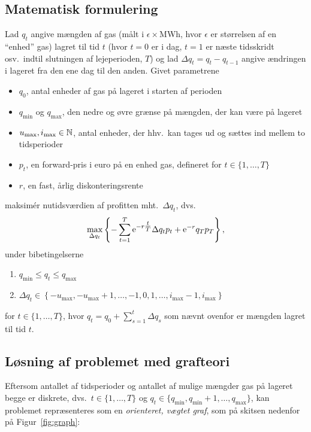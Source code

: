 \documentclass[12pt,a4paper,oneside,final]{article}
\begin{document}
\subsection{Matematisk formulering}
Lad \(q_{t}\) angive mængden af gas (målt i \(\epsilon\times\)MWh, hvor \(\epsilon\) er størrelsen af en ``enhed'' gas) lagret til tid \(t\) (hvor \(t = 0\) er i dag, \(t = 1\) er næste tidsskridt osv.\ indtil slutningen af lejeperioden, \(T\)) og lad \(\Delta q_{t} = q_{t} - q_{t-1}\) angive ændringen i lageret fra den ene dag til den anden.
Givet parametrene
\begin{itemize}
\item \(q_{0}\), antal enheder af gas på lageret i starten af perioden
\item \(q_{\min}\) og \(q_{\max}\), den nedre og øvre grænse på mængden, der kan være på lageret
\item \(u_{\max}, i_{\max} \in \mathbb{N}\), antal enheder, der hhv.\ kan tages ud og sættes ind mellem to tidsperioder
\item \(p_{t}\), en forward-pris i euro på en enhed gas, defineret for \(t \in \{1, \dotsc, T\}\)
\item \(r\), en fast, årlig diskonteringsrente
\end{itemize}
maksimér nutidsværdien af profitten mht.\ \(\Delta q_{t}\), dvs.\
\begin{equation}
  \label{eq:1}
  \max_{\Delta q_{t}}
  \left\{
    - \sum_{t = 1}^{T} \mathrm{e}^{-r\tfrac{t}{T}} \Delta q_{t} p_{t} + \mathrm{e}^{-r} q_{T} p_{T}
  \right\} ,
\end{equation}
under bibetingelserne
\begin{enumerate}
\item \(q_{\min} \leq q_{t} \leq q_{\max}\)
\item \(\Delta q_{t} \in
    \left\{
    -u_{\max}, -u_{\max}+1, \dotsc, -1, 0, 1, \dotsc, i_{\max} - 1, i_{\max}
    \right\}\)
\end{enumerate}
for \(t \in \{1, \dotsc, T\}\), hvor \(q_{t} = q_{0} + \sum_{s = 1}^{t} \Delta q_{s}\) som nævnt ovenfor er mængden lagret til tid \(t\).

\clearpage
\subsection{Løsning af problemet med grafteori}
Eftersom antallet af tidsperioder og antallet af mulige mængder gas på lageret begge er diskrete, dvs.\ \(t \in \{1, \dotsc, T\}\) og \(q_{t} \in \{q_{\min}, q_{\min}+1, \dotsc, q_{\max}\}\), kan problemet repræsenteres som en \emph{orienteret, vægtet graf}, som på skitsen nedenfor på Figur~\ref{fig:graph}:
\end{document}

